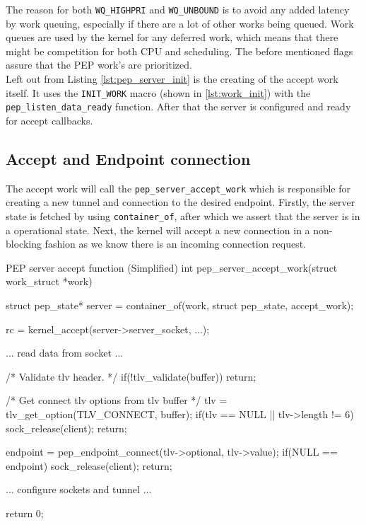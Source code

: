 \documentclass[a4paper,english, 11pt]{report}
\begin{document}
The reason for both \verb|WQ_HIGHPRI| and \verb|WQ_UNBOUND| is to avoid any added latency by work queuing, especially if there are a lot of other works being queued. Work queues are used by the kernel for any deferred work, which means that there might be competition for both CPU and scheduling. The before mentioned flags assure that the PEP work's are prioritized.\\

Left out from Listing \ref{lst:pep_server_init} is the creating of the accept work itself. It uses the \verb|INIT_WORK| macro (shown in \ref{lst:work_init}) with the \verb|pep_listen_data_ready| function. After that the server is configured and ready for accept callbacks.

\subsection{Accept and Endpoint connection}
The accept work will call the \verb|pep_server_accept_work| which is responsible for creating a new tunnel and connection to the desired endpoint. Firstly, the server state is fetched by using \verb|container_of|, after which we assert that the server is in a operational state. Next, the kernel will accept a new connection in a non-blocking fashion as we know there is an incoming connection request.\\

\begin{autonumlstlisting}[label=lst:pep_server_accept]{PEP server accept function (Simplified)}
int pep_server_accept_work(struct work_struct *work)
{
    struct pep_state* server = container_of(work, struct pep_state, accept_work);

    rc = kernel_accept(server->server_socket, ...);
    
    ... read data from socket ...

    /* Validate tlv header. */
    if(!tlv_validate(buffer)){
        return;
    }
    
    /* Get connect tlv options from tlv buffer */
    tlv = tlv_get_option(TLV_CONNECT, buffer);
    if(tlv == NULL || tlv->length != 6){
        sock_release(client);
        return; 
    }

    endpoint = pep_endpoint_connect(tlv->optional, tlv->value);
    if(NULL == endpoint){
        sock_release(client);
        return; 
    }
    
    ... configure sockets and tunnel ...
    
    return 0;
}
\end{autonumlstlisting}
\end{document}
